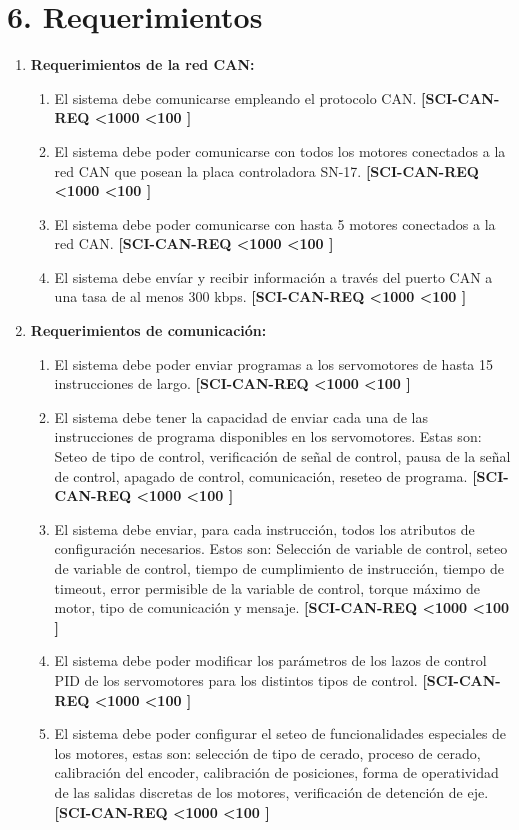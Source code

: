 \documentclass[
11pt, %
]{charter}
\begin{document}
\section{6. Requerimientos}
\label{sec:requerimientos}
\newcommand{\leadingZeroes}[1]{%
\ifnum #1<100{0}\fi%
\ifnum #1<10{0}\fi%
#1}
%
%
\newcommand{\REQ}{%
\stepcounter{REQ}%
\textbf{[SCI-CAN-REQ{\leadingZeroes{\theREQ}]}}}
%

\begin{enumerate}
	\item \textbf{Requerimientos de la red CAN:}
	\begin{enumerate}
			\item El sistema debe comunicarse empleando el protocolo CAN. \REQ
			\item El sistema debe poder comunicarse con todos los motores conectados a la red CAN que posean la placa controladora SN-17. \REQ
			\item El sistema debe poder comunicarse con hasta 5 motores conectados a la red CAN. \REQ
			\item El sistema debe envíar y recibir información a través del puerto CAN a una tasa de al
menos 300 kbps. \REQ
	\end{enumerate}
	\item \textbf{Requerimientos de comunicación:}
	\begin{enumerate}
		\item El sistema debe poder enviar programas a los servomotores de hasta 15 instrucciones
de largo. \REQ
		\item El sistema debe tener la capacidad de enviar cada una de las instrucciones de
programa disponibles en los servomotores. Estas son: Seteo de tipo de control,
verificación de señal de control, pausa de la señal de control, apagado de control,
comunicación, reseteo de programa. \REQ
		\item El sistema debe enviar, para cada instrucción, todos los atributos de configuración
necesarios. Estos son: Selección de variable de control, seteo de variable de control,
tiempo de cumplimiento de instrucción, tiempo de timeout, error permisible de la
variable de control, torque máximo de motor, tipo de comunicación y mensaje. \REQ
		\item El sistema debe poder modificar los parámetros de los lazos de control PID de los
servomotores para los distintos tipos de control. \REQ
		\item El sistema debe poder configurar el seteo de funcionalidades especiales de los
motores, estas son: selección de tipo de cerado, proceso de cerado, calibración del encoder, calibración de posiciones, forma de operatividad de las salidas discretas de los motores, verificación de detención de eje. \REQ

\end{enumerate}
\end{enumerate}
\end{document}

